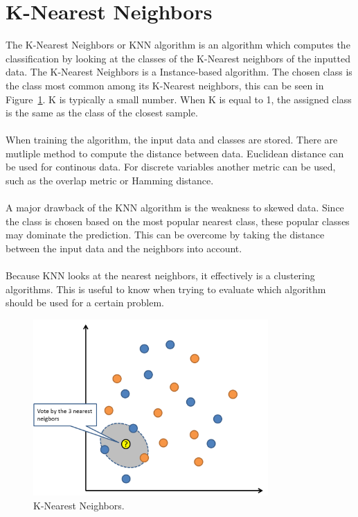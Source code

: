 \section{K-Nearest Neighbors}
The K-Nearest Neighbors or KNN algorithm is an algorithm which computes the classification by looking at the classes of the K-Nearest neighbors of the inputted data. The K-Nearest Neighbors is a Instance-based algorithm. \cite{mlcat} The chosen class is the class most common among its K-Nearest neighbors, this can be seen in Figure~\ref{fig:knn}. K is typically a small number. When K is equal to 1, the assigned class is the same as the class of the closest sample. \\\\
When training the algorithm, the input data and classes are stored. There are mutliple method to compute the distance between data. Euclidean distance can be used for continous data. For discrete variables another metric can be used, such as the overlap metric or Hamming distance.\\\\
A major drawback of the KNN algorithm is the weakness to skewed data. Since the class is chosen based on the most popular nearest class, these popular classes may dominate the prediction. This can be overcome by taking the distance between the input data and the neighbors into account. \\\\
Because KNN looks at the nearest neighbors, it effectively is a clustering algorithms. This is useful to know when trying to evaluate which algorithm should be used for a certain problem.
\begin{figure}[H]
\centering
\includegraphics[width=0.8\textwidth]{Figures/knn}
\decoRule
\caption[K-Nearest Neighbors]{K-Nearest Neighbors.}
\label{fig:knn}
\end{figure}

